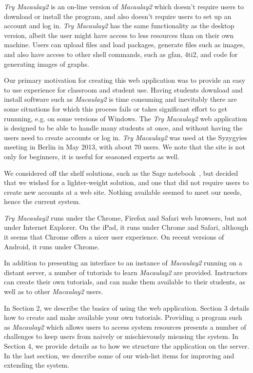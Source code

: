 \documentclass[]{article}
\def\tryM2{{\it Try Macaulay2}}
\def\M2{{\it Macaulay2}}
\begin{document}
\tryM2 is an on-line version of \M2 which
doesn't require users to download or install the program, and also
doesn't require users to set up an account and log in.  \tryM2
has the same functionality as the desktop version,
albeit the user might have access to less resources
than on their own machine.  Users can upload files and
load packages, generate files such as images, and also have
access to other shell commands, such as gfan, 4ti2, and code for
generating images of graphs.

Our primary motivation for creating this web application was to
provide an easy to use experience for classroom and student use.
Having students download and install software such as \M2 is time
consuming and inevitably there are some situations for which this
process fails or takes significant effort to get runnning, e.g. on
some versions of Windows.  The \tryM2 web application is designed to
be able to handle many students at once, and without having the users
need to create accounts or log in.  \tryM2 was used at the Syzygyies
meeting in Berlin in May 2013, with about 70 users.  We note that the
site is not only for beginners, it is useful for seasoned experts as
well.

We considered off the shelf solutions, such as the Sage
notebook~\cite{sagenotebook}, but decided that we wished for a
lighter-weight solution, and one that did not require users to create
new accounts at a web site.  Nothing available seemed to meet our
needs, hence the current system.

\tryM2 runs under the Chrome, Firefox and Safari web browsers, but not
under Internet Explorer.  On the iPad, it runs under Chrome and
Safari, although it seems that Chrome offers a nicer user experience.
On recent versions of Android, it runs under Chrome.

In addition to presenting an interface to an instance of \M2
running on a distant server, a number of tutorials to
learn \M2 are provided.  Instructors can create their own
tutorials, and can make them available to their students, as well as
to other \M2 users.  

In Section 2, we describe the basics of using the web application.
Section 3 details how to create and make available your own tutorials.
Providing a program such as \M2 which allows users to
access system resources presents a number of challenges to keep users
from naively or mischievously misusing the system.  In Section 4, we
provide details as to how we structure the application on the server.
In the last section, we describe some of our wish-list items for
improving and extending the system.
\end{document}
